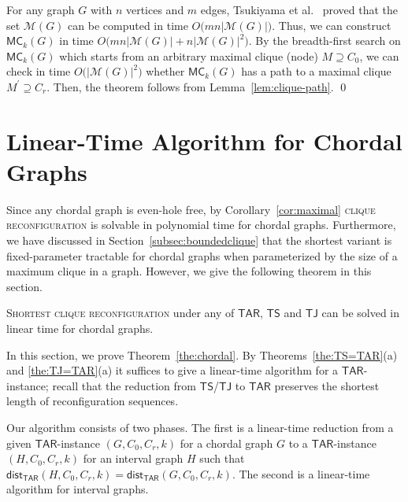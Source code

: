 \documentclass{llncs}
\newcommand{\MC}[2]{\mathsf{MC}_{#1}(#2)}
\newcommand{\TS}{\mathsf{TS}}
\newcommand{\TJ}{\mathsf{TJ}}
\newcommand{\ini}{0}
\newcommand{\tar}{r}
\newcommand{\cliq}{C}
\newcommand{\TARrule}{\mathsf{TAR}}
\newcommand{\distTARG}[4]{\mathsf{dist_{TAR}}(#1,#2,#3,#4)}
\newcommand{\Mset}[1]{\mathcal{M}(#1)}
\newcommand{\subH}{H}
\newcounter{two}
\begin{document}
	For any graph $G$ with $n$ vertices and $m$ edges, Tsukiyama et al.~\cite{TsukiyamaIAS77} proved that the set $\Mset{G}$ can be computed in time $O \bigl(m n \lvert \Mset{G} \rvert \bigr)$.
	Thus, we can construct $\MC{k}{G}$ in time $O \bigl(m n \lvert \Mset{G} \rvert + n \lvert \Mset{G} \rvert^{2} \bigr)$.
	By the breadth-first search on $\MC{k}{G}$ which starts from an arbitrary maximal clique (node) $M \supseteq \cliq_{\ini}$, we can check in time $O \bigl(\lvert \Mset{G} \rvert^{2} \bigr)$ whether $\MC{k}{G}$ has a path to a maximal clique $M^\prime \supseteq \cliq_{\tar}$.
	Then, the theorem follows from Lemma~\ref{lem:clique-path}.
	\qed









	\section{Linear-Time Algorithm for Chordal Graphs}
	\label{sec:chordal}
	
	Since any chordal graph is even-hole free, by Corollary~\ref{cor:maximal} \textsc{clique reconfiguration} is solvable in polynomial time for chordal graphs. 
	Furthermore, we have discussed in Section~\ref{subsec:boundedclique} that the shortest variant is fixed-parameter tractable for chordal graphs when parameterized by the size of a maximum clique in a graph. 
	However, we give the following theorem in this section.
	\begin{theorem} \label{the:chordal}
	\textsc{Shortest clique reconfiguration} under any of $\TARrule$, $\TS$ and $\TJ$ can be solved in linear time for chordal graphs. 
	\end{theorem}

	In this section, we prove Theorem~\ref{the:chordal}. 
	By Theorems~\ref{the:TS=TAR}(a) and \ref{the:TJ=TAR}(a) it suffices to give a linear-time algorithm for a $\TARrule$-instance;
recall that the reduction from $\TS$/$\TJ$ to $\TARrule$ preserves the shortest length of reconfiguration sequences.

	Our algorithm consists of two phases.
The first is a linear-time reduction from a given $\TARrule$-instance $(G, \cliq_{\ini}, \cliq_{\tar}, k)$ for a chordal graph $G$ to a $\TARrule$-instance $(\subH, \cliq_{\ini}, \cliq_{\tar}, k)$ for an interval graph $\subH$ such that $\distTARG{\subH}{\cliq_{\ini}}{\cliq_{\tar}}{k} = \distTARG{G}{\cliq_{\ini}}{\cliq_{\tar}}{k}$. 
	The second is a linear-time algorithm for interval graphs.
\end{document}
